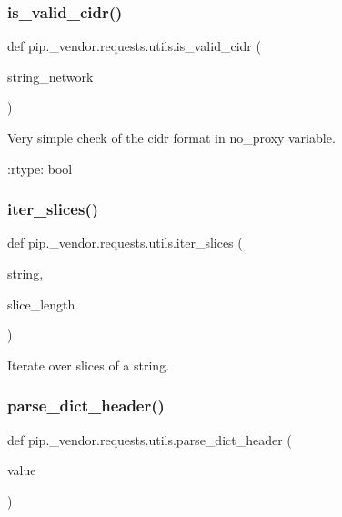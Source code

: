 \subsubsection{\texorpdfstring{is\+\_\+valid\+\_\+cidr()}{is\_valid\_cidr()}}
{\footnotesize\ttfamily def pip.\+\_\+vendor.\+requests.\+utils.\+is\+\_\+valid\+\_\+cidr (\begin{DoxyParamCaption}\item[{}]{string\+\_\+network }\end{DoxyParamCaption})}

\begin{DoxyVerb}Very simple check of the cidr format in no_proxy variable.

:rtype: bool
\end{DoxyVerb}
 \mbox{\label{namespacepip_1_1__vendor_1_1requests_1_1utils_ae22cd43e29bae215457876aae0b77681}} 
\subsubsection{\texorpdfstring{iter\+\_\+slices()}{iter\_slices()}}
{\footnotesize\ttfamily def pip.\+\_\+vendor.\+requests.\+utils.\+iter\+\_\+slices (\begin{DoxyParamCaption}\item[{}]{string,  }\item[{}]{slice\+\_\+length }\end{DoxyParamCaption})}

\begin{DoxyVerb}Iterate over slices of a string.\end{DoxyVerb}
 \mbox{\label{namespacepip_1_1__vendor_1_1requests_1_1utils_aa842aa43c5306b1871a2a522b1a4e43e}} 
\subsubsection{\texorpdfstring{parse\+\_\+dict\+\_\+header()}{parse\_dict\_header()}}
{\footnotesize\ttfamily def pip.\+\_\+vendor.\+requests.\+utils.\+parse\+\_\+dict\+\_\+header (\begin{DoxyParamCaption}\item[{}]{value }\end{DoxyParamCaption})}

